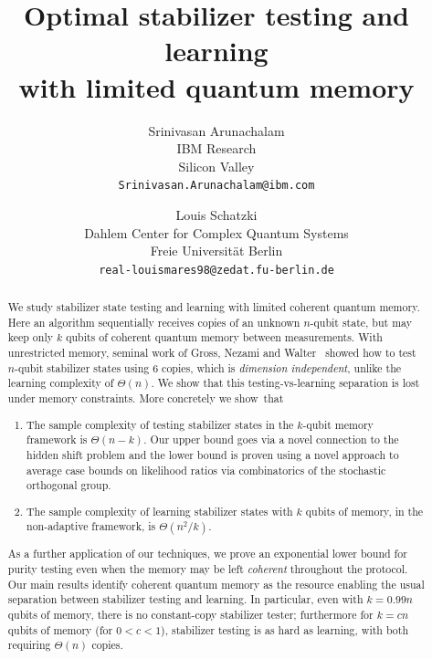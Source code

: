 \documentclass[11pt]{article}
\begin{document}
\title{Optimal stabilizer testing and learning\\ with limited quantum memory}
\author{
Srinivasan Arunachalam\\[2mm]
\small IBM Research\\\small Silicon Valley\\
\small \texttt{Srinivasan.Arunachalam@ibm.com}
\and
Louis Schatzki\\[2mm]
\small  Dahlem Center for Complex Quantum Systems\\\small  Freie Universität Berlin\\
\small \texttt{real-louismares98@zedat.fu-berlin.de}
}

\maketitle
\begin{abstract}
We study stabilizer state testing and learning with limited coherent quantum memory. Here an algorithm sequentially receives copies of an unknown $n$-qubit state, but may keep only $k$ qubits of coherent quantum memory between measurements. With unrestricted memory, seminal work of Gross, Nezami and Walter~\cite{gross2021schur} showed how to test $n$-qubit stabilizer states  using $6$ copies, which is \emph{dimension independent}, unlike the learning complexity of $\Theta(n)$. We show that this testing-vs-learning separation is lost under memory constraints. More concretely we show~that \vspace{1mm}

 \begin{enumerate}
       \item The sample complexity of testing stabilizer states in the $k$-qubit memory framework is $\Theta(n-k)$. Our upper bound goes via a novel connection to the hidden shift problem and the lower bound is proven using a novel approach to average case bounds on likelihood ratios via combinatorics of the stochastic orthogonal group.
    
       \item The sample complexity of learning stabilizer states with $k$ qubits of memory, in the non-adaptive framework,  is $\Theta(n^2/k)$.\vspace{1mm} 
   \end{enumerate}

 
\noindent As a further application of our techniques, we prove an exponential lower bound for purity testing even when the memory may be left \emph{coherent} throughout the protocol. Our main results identify coherent quantum memory as the resource enabling the usual separation between stabilizer testing and learning. In particular, even with $k=0.99n$ qubits of memory, there is no constant-copy stabilizer tester; furthermore for $k=cn$ qubits of memory (for $0< c < 1$), stabilizer testing is as hard as learning, with both requiring $\Theta(n)$ copies.
\end{abstract}
\end{document}

